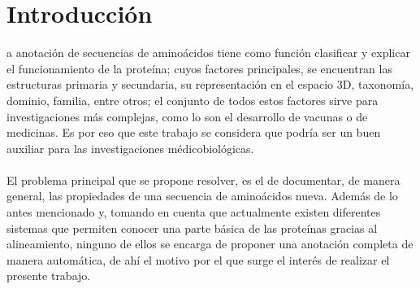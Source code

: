 \documentclass{article}
\begin{document}
\section{Introducción}
a anotación de secuencias de aminoácidos tiene como función clasificar y explicar el funcionamiento de la proteína; cuyos factores principales, se encuentran las estructuras primaria y secundaria, su representación en el espacio 3D, taxonomía, dominio, familia, entre otros; el conjunto de todos estos factores sirve para investigaciones más complejas, como lo son el desarrollo de vacunas o de medicinas. Es por eso que este trabajo se considera que podría ser un buen auxiliar para las investigaciones médicobiológicas.\\\\
El problema principal que se propone resolver, es el de documentar, de manera general, las propiedades de una secuencia de aminoácidos nueva. Además de lo antes mencionado y, tomando en cuenta que actualmente existen diferentes sistemas que permiten conocer una parte básica de las proteínas gracias al alineamiento, ninguno de ellos se encarga de proponer una anotación completa de manera automática, de ahí el motivo por el que surge el interés de realizar el presente trabajo.
\end{document}
